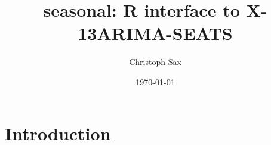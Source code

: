 \documentclass[a4paper, 10pt]{article}
\begin{document}
\title{\textbf{seasonal}: R interface to X-13ARIMA-SEATS}

\author{Christoph Sax}

\date{\today}
\maketitle

\section{Introduction}


\end{document}
